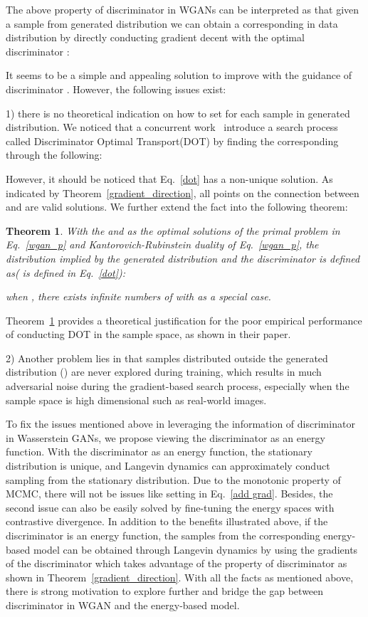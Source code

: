 \documentclass{article}
\newtheorem{theorem}{Theorem}
\begin{document}
The above  property of discriminator in WGANs can be interpreted as that given a sample  from generated distribution  we can obtain a corresponding  in data distribution  by directly conducting gradient decent with the optimal discriminator :

It seems to be a simple and appealing solution to improve  with the guidance of discriminator . However, the following issues exist: 

1) there is no theoretical indication on how to set  for each sample  in generated distribution. We noticed that a concurrent work~\cite{tanaka2019discriminator} introduce a search process called Discriminator Optimal Transport(DOT) by finding the corresponding  through the following:

However, it should be noticed that Eq.~\ref{dot} has a non-unique solution. As indicated by Theorem~\ref{gradient_direction}, all points on the connection between  and  are valid solutions. We further extend the fact into the following theorem:
\begin{theorem}
\label{opt_fail}
    With the  and  as the optimal solutions of the primal problem in Eq.~\ref{wgan_p} and  Kantorovich-Rubinstein duality of Eq.~\ref{wgan_p}, the distribution  implied by the generated distribution and the discriminator  is defined as( is defined in Eq.~\ref{dot}):
    
    when , there exists infinite numbers of  with  as a special case. 
\end{theorem}
Theorem~\ref{opt_fail} provides a theoretical justification for the poor empirical performance of conducting DOT in the sample space, as shown in their paper.

2) Another problem lies in that samples distributed outside the generated distribution () are never explored during training, which results in much adversarial noise during the gradient-based search process, especially when the sample space is high dimensional such as real-world images. 

To fix the issues mentioned above in leveraging the information of discriminator in Wasserstein GANs, we propose viewing the discriminator as an energy function. With the discriminator as an energy function, the stationary distribution is unique, and Langevin dynamics can approximately conduct sampling from the stationary distribution. Due to the monotonic property of MCMC, there will not be issues like setting  in Eq.~\ref{add grad}. Besides, the second issue can also be easily solved by fine-tuning the energy spaces with contrastive divergence.  In addition to the benefits illustrated above, if the discriminator is an energy function, the samples from the corresponding energy-based model can be obtained through Langevin dynamics by using the gradients of the discriminator which takes advantage of the  property of discriminator as shown in Theorem~\ref{gradient_direction}. With all the facts as mentioned above, there is strong motivation to explore further and bridge the gap between discriminator in WGAN and the energy-based model. 
\end{document}
